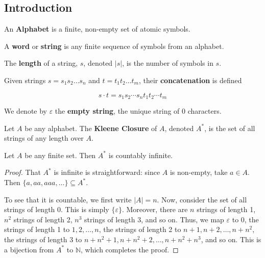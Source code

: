 \subsection{Introduction}\label{subsec:introduction}
\begin{definition}
 An \textbf{Alphabet} is a finite, non-empty set of atomic symbols.
\end{definition}

\begin{definition}
 A \textbf{word} or \textbf{string} is any finite sequence of symbols from an alphabet. 
\end{definition}

\begin{definition}
 The \textbf{length} of a string, $s$, denoted $|s|$, is the number of symbols in $s$. 
\end{definition}

\begin{definition}
 Given strings $s=s_1s_2\hdots s_n$ and $t=t_1t_2\hdots t_m$, their \textbf{concatenation} is defined 
 
 \[s\cdot t=s_1s_2\cdots s_nt_1t_2\cdots t_m\]
\end{definition}

We denote by $\varepsilon$ the \textbf{empty string}, the unique string of 0 characters. 

\begin{definition}
 Let $A$ be any alphabet. The \textbf{Kleene Closure} of $A$, denoted $A^*$, is the set of all strings of any length over $A$.  
\end{definition}

\begin{theorem}
 Let $A$ be any finite set. Then $A^*$ is countably infinite. 
\end{theorem}

\begin{proof}
 That $A^*$ is infinite is straightforward: since $A$ is non-empty, take $a\in A$. Then $\{a, aa, aaa, \hdots\}\subseteq A^*$.
 
 To see that it is countable, we first write $|A|=n$. Now, consider the set of all strings of length 0. This is simply $\{\varepsilon\}$. Moreover, there are $n$ strings of length 1, $n^2$ strings of length 2, $n^3$ strings of length 3, and so on. Thus, we map $\varepsilon$ to 0, the strings of length 1 to $1, 2, \hdots, n$, the strings of length 2 to $n+1, n+2, \hdots, n+n^2$, the strings of length 3 to $n+n^2+1, n+n^2+2,\hdots, n+n^2+n^3$, and so on. This is a bijection from $A^*$ to $\mathbb{N}$, which completes the proof.
\end{proof}

